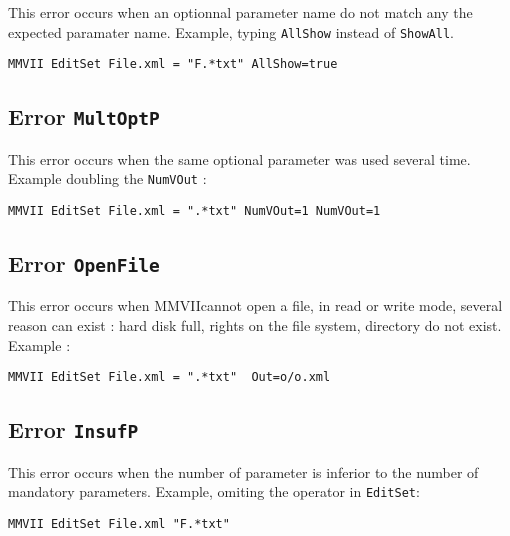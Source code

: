 \documentclass[a4paper]{book}
\newcommand{\PPP}{MMVII}
\begin{document}
{This error occurs when an optionnal parameter name do not match any the expected
paramater name. Example, typing {\tt AllShow} instead of {\tt ShowAll}.

\begin{verbatim}
MMVII EditSet File.xml = "F.*txt" AllShow=true
\end{verbatim}


\subsection{Error {\tt MultOptP}}

This error occurs when the same optional parameter was used several time. Example doubling the {\tt NumVOut} :

\begin{verbatim}
MMVII EditSet File.xml = ".*txt" NumVOut=1 NumVOut=1
\end{verbatim}


\subsection{Error {\tt OpenFile}}

This error occurs when \PPP cannot open a file, in read or write mode, several reason can exist :
hard disk full, rights on the file system, directory do not exist. Example :

\begin{verbatim}
MMVII EditSet File.xml = ".*txt"  Out=o/o.xml
\end{verbatim}

\subsection{Error {\tt InsufP}}

This error occurs when the number of parameter is inferior to the number
of mandatory parameters.  Example, omiting the operator in {\tt EditSet}:

\begin{verbatim}
MMVII EditSet File.xml "F.*txt"
\end{verbatim}


}
\end{document}
